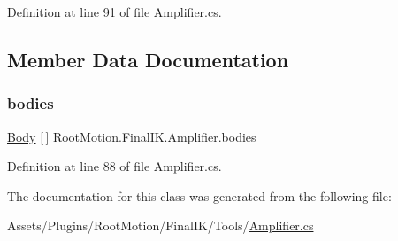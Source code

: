 Definition at line 91 of file Amplifier.\+cs.



\subsection{Member Data Documentation}
\mbox{\label{class_root_motion_1_1_final_i_k_1_1_amplifier_a17068ab4a0a23bb5498dbe7e0ee29d5c}} 
\subsubsection{\texorpdfstring{bodies}{bodies}}
{\footnotesize\ttfamily \mbox{\hyperlink{class_root_motion_1_1_final_i_k_1_1_amplifier_1_1_body}{Body}} \mbox{[}$\,$\mbox{]} Root\+Motion.\+Final\+I\+K.\+Amplifier.\+bodies}



Definition at line 88 of file Amplifier.\+cs.



The documentation for this class was generated from the following file\+:\begin{DoxyCompactItemize}
\item 
Assets/\+Plugins/\+Root\+Motion/\+Final\+I\+K/\+Tools/\mbox{\hyperlink{_amplifier_8cs}{Amplifier.\+cs}}\end{DoxyCompactItemize}
